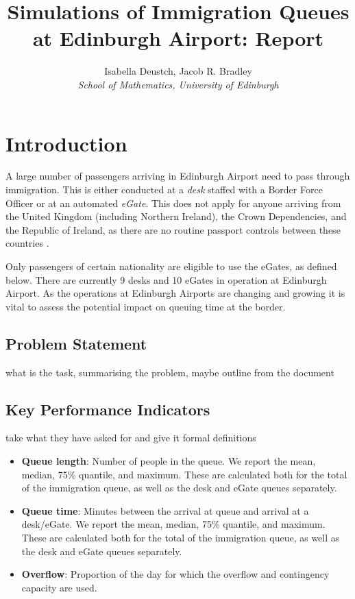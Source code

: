 \documentclass[10pt]{article}
\title{Simulations of Immigration Queues at Edinburgh Airport: Report}
\author{Isabella Deustch, Jacob R. Bradley
 \\ \emph{School of Mathematics, University of Edinburgh}}
\begin{document}
\maketitle

\section{Introduction}

A large number of passengers arriving in Edinburgh Airport need to pass through immigration. This is either conducted at a \textit{desk} staffed with a Border Force Officer or at an automated \textit{eGate}. This does not apply for anyone arriving from the United Kingdom (including Northern Ireland), the Crown Dependencies, and the Republic of Ireland, as there are no routine passport controls between these countries \cite{common_travel_area}.

Only passengers of certain nationality are eligible to use the eGates, as defined below. There are currently 9 desks and 10 eGates in operation at Edinburgh Airport. As the operations at Edinburgh Airports are changing and growing it is vital to assess the potential impact on queuing time at the border. 

\subsection{Problem Statement}
what is the task, summarising the problem, maybe  outline from the document

\subsection{Key Performance Indicators}
take what they have asked for and give it formal definitions
\begin{itemize}
    \item \textbf{Queue length}: Number of people in the queue. We report the mean, median, 75\% quantile, and maximum. These are calculated both for the total of the immigration queue, as well as the desk and eGate queues separately.
    \item \textbf{Queue time}: Minutes between the arrival at queue and arrival at a desk/eGate. We report the mean, median, 75\% quantile, and maximum. These are calculated both for the total of the immigration queue, as well as the desk and eGate queues separately.
    \item \textbf{Overflow}: Proportion of the day for which the overflow and contingency capacity are used.
\end{itemize}
\end{document}

